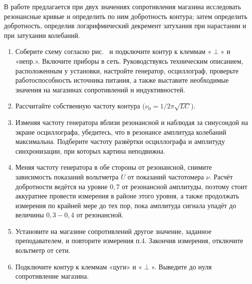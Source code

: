 \begin{lab:task}

В работе предлагается при двух значениях сопротивления магазина
исследовать резонансные кривые и определить по ним добротность контура;
затем определить добротность, определив логарифмический декремент
затухания при нарастании и при затухании колебаний.

	\begin{enumerate}

	\item Соберите схему согласно рис.~ и подключите контур к клеммам «$\perp$» и
«непр.». Включите приборы в сеть. Руководствуясь техническим описанием,
расположенным у установки, настройте генератор, осциллограф, проверьте
работоспособность источника питания, а также выставите необходимые
значения на магазинах сопротивлений и индуктивностей.


	\item Рассчитайте собственную частоту контура
($\nu_{0} = 1/2\pi\sqrt{LC}$).

	\item Изменяя частоту генератора вблизи резонансной и наблюдая за
синусоидой на экране осциллографа, убедитесь, что в резонансе амплитуда
колебаний максимальна. Подберите частоту развёртки осциллографа и
амплитуду синхронизации, при которых картина неподвижна.

	\item Меняя частоту генератора в обе стороны от резонансной, снимите
зависимость показаний вольтметра $U$ от показаний частотомера
$\nu$. Расчёт добротности ведётся на уровне $0,7$ от резонансной
амплитуды, поэтому стоит аккуратнее провести измерения в районе этого
уровня, а также продолжать измерения по крайней мере до тех пор, пока
амплитуда сигнала упадёт до величины $0,3 - 0,4$ от резонансной.

	\item Установите на магазине сопротивлений другое значение, заданное
преподавателем, и повторите измерения п.4. Закончив измерения, отключите
вольтметр от сети.


	\item Подключите контур к клеммам «цуги» и «$\perp$». Выведите до нуля
сопротивление магазина.


\end{enumerate}
\end{lab:task}
